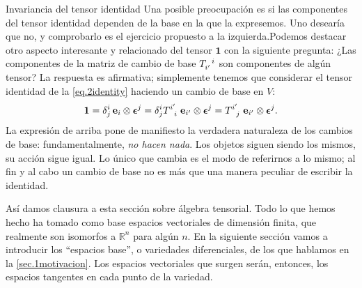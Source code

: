 \begin{observation}
    {Invariancia del tensor identidad
    \label{obs.2-invariancia_identidad}}
    Una posible preocupación es si las componentes del tensor identidad dependen de la base en la que la expresemos. Uno desearía que no, y comprobarlo es el ejercicio propuesto a la izquierda.Podemos destacar otro aspecto interesante y relacionado del tensor \(\mathbf{1}\) con la siguiente pregunta: ¿Las componentes de la matriz de cambio de base \(\tensor{T}{_{i'}^i}\) son componentes de algún tensor? La respuesta es afirmativa; simplemente tenemos que considerar el tensor identidad de la \cref{eq.2identity} haciendo un cambio de base en \(V\):
    \begin{equation}
        \mathbf{1} = \delta^i_j\, \mathbf{e}_i\otimes\boldsymbol{\epsilon}^j = \delta^{i}_{j} \tensor{T}{^{i'}_i}\,\mathbf{e}_{i'}\otimes\boldsymbol{\epsilon}^j = \tensor{T}{^{i'}_j}\,\mathbf{e}_{i'}\otimes\boldsymbol{\epsilon}^j.
    \end{equation}
    La expresión de arriba pone de manifiesto la verdadera naturaleza de los cambios de base: fundamentalmente, \emph{no hacen nada}. Los objetos siguen siendo los mismos, su acción sigue igual. Lo único que cambia es el modo de referirnos a lo mismo; al fin y al cabo un cambio de base no es más que una manera peculiar de escribir la identidad.
\end{observation}

Así damos clausura a esta sección sobre álgebra tensorial. Todo lo que hemos hecho ha tomado como base espacios vectoriales de dimensión finita, que realmente son isomorfos a \(\mathbb{R}^n\) para algún \(n\). En la siguiente sección vamos a introducir los ``espacios base'', o variedades diferenciales, de los que hablamos en la \cref{sec.1motivacion}. Los espacios vectoriales que surgen serán, entonces, los espacios tangentes en cada punto de la variedad.
